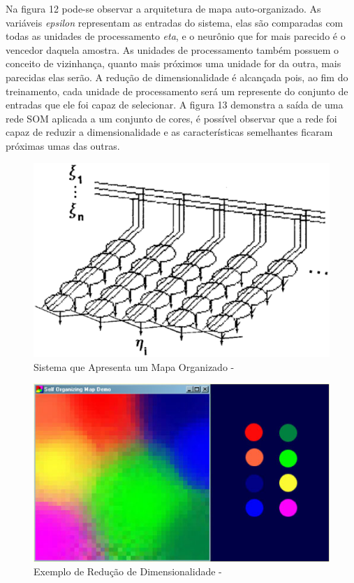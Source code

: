 Na figura 12 pode-se observar a arquitetura de mapa auto-organizado. As variáveis \textit{epsilon} representam as entradas do sistema, elas são comparadas com todas as unidades de processamento \textit{eta}, e o neurônio que for mais parecido é o vencedor daquela amostra. As unidades de processamento também possuem o conceito de vizinhança, quanto mais próximos uma unidade for da outra, mais parecidas elas serão. A redução de dimensionalidade é alcançada pois, ao fim do treinamento, cada unidade de processamento será um represente do conjunto de entradas que ele foi capaz de selecionar. A figura 13 demonstra a saída de uma rede SOM aplicada a um conjunto de cores, é possível observar que a rede foi capaz de reduzir a dimensionalidade e as características semelhantes ficaram próximas umas das outras.    

\begin{figure}[!h]
\centering
\includegraphics[keepaspectratio=true,scale=0.40]
{figuras/redesom.eps}
\caption{Sistema que Apresenta um Mapa Organizado - \cite{kohonen1982}}
\label{data_titatic}
\end{figure}


\begin{figure}[!h]
\centering
\includegraphics[keepaspectratio=true,scale=0.50]
{figuras/dimensionreduction.eps}
\caption{Exemplo de Redução de Dimensionalidade - \cite{somaijk}}
\label{data_titatic}
\end{figure}


